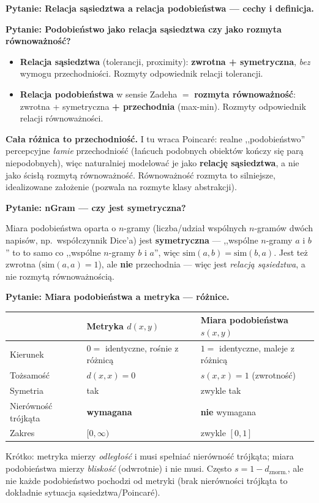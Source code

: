 \documentclass[11pt]{article}
\newcommand{\pytan}[1]{\medskip\noindent\textbf{\textcolor{anbg}{Pytanie:} #1}\par\smallskip}
\begin{document}
\pytan{Relacja sąsiedztwa a relacja podobieństwa --- cechy i definicja.}
\pytan{Podobieństwo jako relacja sąsiedztwa czy jako rozmyta równoważność?}
\begin{itemize}[leftmargin=*]
\item \textbf{Relacja sąsiedztwa} (tolerancji, proximity): \textbf{zwrotna + symetryczna},
  \emph{bez} wymogu przechodniości. Rozmyty odpowiednik relacji tolerancji.
\item \textbf{Relacja podobieństwa} w sensie Zadeha $=$ \textbf{rozmyta równoważność}:
  zwrotna + symetryczna \textbf{+ przechodnia} (max-min). Rozmyty odpowiednik relacji
  równoważności.
\end{itemize}
\textbf{Cała różnica to przechodniość.} I tu wraca Poincaré: realne ,,podobieństwo''
percepcyjne \emph{łamie} przechodniość (łańcuch podobnych obiektów kończy się parą
niepodobnych), więc naturalniej modelować je jako \textbf{relację sąsiedztwa}, a nie jako
ścisłą rozmytą równoważność. Równoważność rozmyta to silniejsze, idealizowane założenie
(pozwala na rozmyte klasy abstrakcji).

\pytan{nGram --- czy jest symetryczna?}
Miara podobieństwa oparta o $n$-gramy (liczba/udział wspólnych $n$-gramów dwóch napisów,
np.\ współczynnik Dice'a) jest \textbf{symetryczna} --- ,,wspólne $n$-gramy $a$ i $b$'' to
to samo co ,,wspólne $n$-gramy $b$ i $a$'', więc $\text{sim}(a,b)=\text{sim}(b,a)$. Jest
też zwrotna ($\text{sim}(a,a)=1$), ale \textbf{nie} przechodnia --- więc jest
\emph{relacją sąsiedztwa}, a nie rozmytą równoważnością.

\pytan{Miara podobieństwa a metryka --- różnice.}
\begin{center}
\begin{tabular}{lll}
\toprule
 & Metryka $d(x,y)$ & Miara podobieństwa $s(x,y)$ \\
\midrule
Kierunek & $0=$ identyczne, rośnie z różnicą & $1=$ identyczne, maleje z różnicą \\
Tożsamość & $d(x,x)=0$ & $s(x,x)=1$ (zwrotność) \\
Symetria & tak & zwykle tak \\
Nierówność trójkąta & \textbf{wymagana} & \textbf{nie} wymagana \\
Zakres & $[0,\infty)$ & zwykle $[0,1]$ \\
\bottomrule
\end{tabular}
\end{center}
Krótko: metryka mierzy \emph{odległość} i musi spełniać nierówność trójkąta; miara
podobieństwa mierzy \emph{bliskość} (odwrotnie) i nie musi. Często $s=1-d_{\text{znorm.}}$,
ale nie każde podobieństwo pochodzi od metryki (brak nierówności trójkąta to dokładnie
sytuacja sąsiedztwa/Poincaré).
\end{document}
